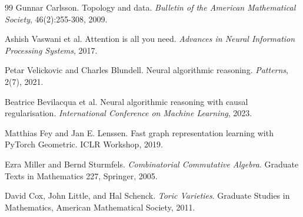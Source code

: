 \documentclass[11pt]{article}
\begin{document}
\begin{thebibliography}{99}
Gunnar Carlsson.
\newblock Topology and data.
\newblock \emph{Bulletin of the American Mathematical Society}, 46(2):255-308, 2009.

Ashish Vaswani et al.
\newblock Attention is all you need.
\newblock \emph{Advances in Neural Information Processing Systems}, 2017.

Petar Velickovic and Charles Blundell.
\newblock Neural algorithmic reasoning.
\newblock \emph{Patterns}, 2(7), 2021.

Beatrice Bevilacqua et al.
\newblock Neural algorithmic reasoning with causal regularisation.
\newblock \emph{International Conference on Machine Learning}, 2023.

Matthias Fey and Jan E. Lenssen.
\newblock Fast graph representation learning with PyTorch Geometric.
\newblock ICLR Workshop, 2019.

Ezra Miller and Bernd Sturmfels.
\newblock \emph{Combinatorial Commutative Algebra}.
\newblock Graduate Texts in Mathematics 227, Springer, 2005.

David Cox, John Little, and Hal Schenck.
\newblock \emph{Toric Varieties}.
\newblock Graduate Studies in Mathematics, American Mathematical Society, 2011.

\end{thebibliography}
\end{document}
